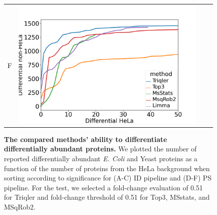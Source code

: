 \documentclass[11pt]{article}
\begin{document}
\begin{figure}[hbt]
\begin{tabular}{lclc}
        F & \includegraphics[width=0.4\linewidth]{../../result/report_plots_pipeline/diff_HeLa_vs_nonHeLa_PS_all_0.51_Limma.png} \\ 

    \end{tabular}
    \caption{{\bf The compared methods' ability to differentiate differentially abundant proteins.} We plotted the number of reported differentially abundant  {\em E. Coli} and Yeast proteins as a function of the number of proteins from the HeLa background when sorting according to significance for (A-C) ID pipeline and (D-F) PS pipeline. For the test, we selected a fold-change evaluation of 0.51 for Triqler and fold-change threshold of 0.51 for Top3, MSstats, and MSqRob2. \label{fig:ability_to_differentiate_differentially_abundant_specie_vs_hela}}
\end{figure}
\end{document}

